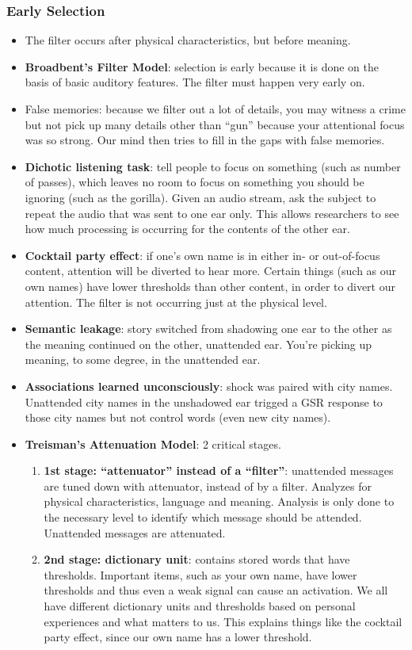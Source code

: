\documentclass[]{article}
\begin{document}
			\subsubsection{Early Selection}
				\begin{itemize}
					\item The filter occurs after physical characteristics, but before meaning.
				\item \textbf{Broadbent's Filter Model}: selection is early because it is done on the basis of basic auditory features. The filter must happen very early on.
					\item False memories: because we filter out a lot of details, you may witness a crime but not pick up many details other than ``gun'' because your attentional focus was so strong. Our mind then tries to fill in the gaps with false memories.
					\item \textbf{Dichotic listening task}: tell people to focus on something (such as number of passes), which leaves no room to focus on something you should be ignoring (such as the gorilla). Given an audio stream, ask the subject to repeat the audio that was sent to one ear only. This allows researchers to see how much processing is occurring for the contents of the other ear.
					\item \textbf{Cocktail party effect}: if one's own name is in either in- or out-of-focus content, attention will be diverted to hear more. Certain things (such as our own names) have lower thresholds than other content, in order to divert our attention. The filter is not occurring just at the physical level.
					\item \textbf{Semantic leakage}: story switched from shadowing one ear to the other as the meaning continued on the other, unattended ear. You're picking up meaning, to some degree, in the unattended ear.
					\item \textbf{Associations learned unconsciously}: shock was paired with city names. Unattended city names in the unshadowed ear trigged a GSR response to those city names but not control words (even new city names).
					\item \textbf{Treisman's Attenuation Model}: 2 critical stages.
						\begin{enumerate}
							\item \textbf{1st stage: ``attenuator'' instead of a ``filter''}: unattended messages are tuned down with attenuator, instead of by a filter. Analyzes for physical characteristics, language and meaning. Analysis is only done to the necessary level to identify which message should be attended. Unattended messages are attenuated.
							\item \textbf{2nd stage: dictionary unit}: contains stored words that have thresholds. Important items, such as your own name, have lower thresholds and thus even a weak signal can cause an activation. We all have different dictionary units and thresholds based on personal experiences and what matters to us. This explains things like the cocktail party effect, since our own name has a lower threshold.
						\end{enumerate}
				\end{itemize}
\end{document}
